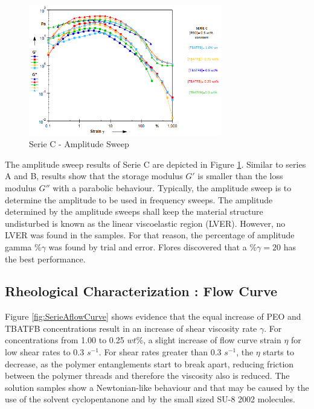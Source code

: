 \begin{figure}[th]
\centering
\includegraphics[width=0.75\textwidth]{./Figures/SerieCampSweep.png}
\decoRule
\caption[Serie C - Amplitude Sweep]{Serie C - Amplitude Sweep \cite{Flores2017}}
\label{fig:SerieCampSweep}
\end{figure}

The amplitude sweep results of Serie C are depicted in Figure \ref{fig:SerieCampSweep}. Similar to series A and B, results show that the storage modulus $G'$ is smaller than the loss modulus $G''$ with a parabolic behaviour. Typically, the amplitude sweep is to determine the amplitude to be used in frequency sweeps. The amplitude determined by the amplitude sweeps shall keep the material structure undisturbed is known as the linear viscoelastic region (LVER). However, no LVER was found in the samples. For that reason, the percentage of amplitude gamma $\% \gamma$ was found by trial and error. Flores discovered that a $\% \gamma = 20$ has the best performance. 

\subsection{Rheological Characterization : \textbf{Flow Curve}}
Figure \ref{fig:SerieAflowCurve} shows evidence that the equal increase of PEO and TBATFB concentrations result in an increase of shear viscosity rate $\gamma$. For concentrations from 1.00 to 0.25 $w t \%$, a slight increase of flow curve strain $\eta$ for low shear rates to 0.3 $s^{-1}$. For shear rates greater than 0.3 $s^{-1}$, the $\eta$ starts to decrease, as the polymer entanglements start to break apart, reducing friction between the polymer threads and therefore the viscosity also is reduced. The solution samples show a Newtonian-like behaviour and that may be caused by the use of the solvent cyclopentanone and by the small sized SU-8 2002 molecules.

